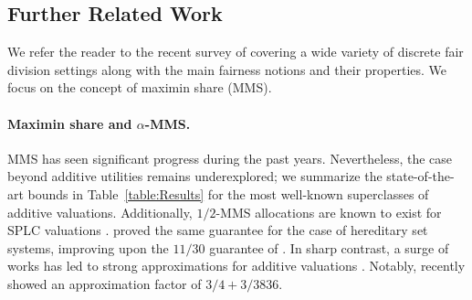 \subsection{Further Related Work}


We refer the reader to the recent survey of \cite{AmanatidisABFLMVW23Survey} covering a wide variety of discrete fair division settings along with the main fairness notions and their properties. We focus on the concept of maximin share (MMS).

\paragraph{Maximin share and $\alpha$-MMS.} MMS has seen significant progress during the past years. Nevertheless, the case beyond additive utilities remains underexplored; we summarize the state-of-the-art bounds in Table~\ref{table:Results} for the most well-known superclasses of additive valuations. Additionally,  
 $1/2$-MMS allocations are known to exist for SPLC valuations \cite{ChekuriKKM24}. \cite{Hummel:HSS24} proved the same guarantee for the case of hereditary set systems, improving upon the $11/30$ guarantee of \cite{LiVetta21}. In sharp contrast, a surge of works has led to strong approximations for additive valuations \cite{KurokawaProcacciaWang18,AmanatidisMNS17,GhodsiHSSY21,GargTaki21,AkramiGST23}. Notably, \cite{AkramiGarg24} recently showed an approximation factor of $3/4+3/3836$. 



